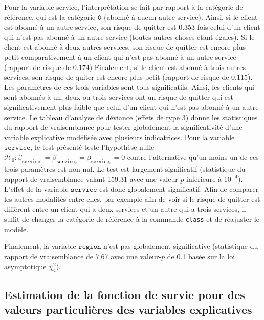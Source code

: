 \documentclass[
  11pt,
  letterpaper,
]{scrbook}
\theoremstyle{definition}
\theoremstyle{remark}
\begin{document}
Pour la variable service, l'interprétation se fait par rapport à la
catégorie de référence, qui est la catégorie \(\texttt{0}\) (abonné à
aucun autre service). Ainsi, si le client est abonné à un autre service,
son risque de quitter est 0.353 fois celui d'un client qui n'est pas
abonné à un autre service (toutes autres choses étant égales). Si le
client est abonné à deux autres services, son risque de quitter est
encore plus petit comparativement à un client qui n'est pas abonné à un
autre service (rapport de risque de 0.174) Finalement, si le client est
abonné à trois autres services, son risque de quiter est encore plus
petit (rapport de risque de 0.115). Les paramètres de ces trois
variables sont tous significatifs. Ainsi, les clients qui sont abonnés à
un, deux ou trois services ont un risque de quitter qui est
significativement plus faible que celui d'un client qui n'est pas abonné
à un autre service. Le tableau d'analyse de déviance (effets de type 3)
donne les statistiques du rapport de vraisemblance pour tester
globalement la significativité d'une variable explicative modélisée avec
plusieurs indicatrices. Pour la variable \(\texttt{service}\), le test
présenté teste l'hypothèse nulle
\(\mathscr{H}_0: \beta_{\texttt{service}_1}=\beta_{\texttt{service}_2}=\beta_{\texttt{service}_3}=0\)
contre l'alternative qu'un moins un de ces trois paramètres est non-nul.
Le test est largement significatif (statistique du rapport de
vraisemblance valant 159.31 avec une valeur-\(p\) inférieure à
\(10^{-4}\)). L'effet de la variable \(\texttt{service}\) est donc
globalement significatif. Afin de comparer les autres modalités entre
elles, par exemple afin de voir si le risque de quitter est différent
entre un client qui a deux services et un autre qui a trois services, il
suffit de changer la catégorie de référence à la commande \texttt{class}
et de réajuster le modèle.

Finalement, la variable \(\texttt{region}\) n'est pas globalement
significative (statistique du rapport de vraisemblance de 7.67 avec une
valeur-\(p\) de 0.1 basée sur la loi asymptotique \(\chi^2_4\)).

\hypertarget{estimation-de-la-fonction-de-survie-pour-des-valeurs-particuliuxe8res-des-variables-explicatives}{%
\subsection{Estimation de la fonction de survie pour des valeurs
particulières des variables
explicatives}\label{estimation-de-la-fonction-de-survie-pour-des-valeurs-particuliuxe8res-des-variables-explicatives}}
\end{document}

